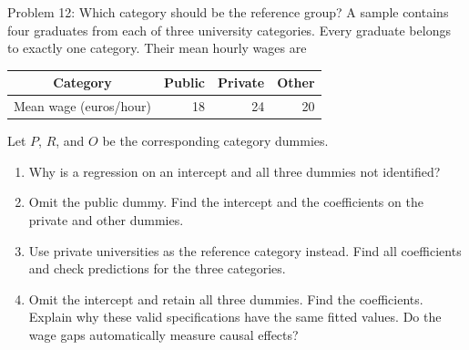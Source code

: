 \documentclass[notes,10pt, aspectratio=169]{beamer}
\begin{document}
\begin{frame}{Problem 12: Which category should be the reference group?}
A sample contains four graduates from each of three university categories. Every graduate belongs to exactly one category. Their mean hourly wages are
\begin{center}
\begin{tabular}{c|rrr}
Category & Public & Private & Other\\ \hline
Mean wage (euros/hour) & 18 & 24 & 20
\end{tabular}
\end{center}
Let $P$, $R$, and $O$ be the corresponding category dummies.
\begin{enumerate}
\setlength{\itemsep}{6pt}
\item Why is a regression on an intercept and all three dummies not identified?
\item Omit the public dummy. Find the intercept and the coefficients on the private and other dummies.
\item Use private universities as the reference category instead. Find all coefficients and check predictions for the three categories.
\item Omit the intercept and retain all three dummies. Find the coefficients. Explain why these valid specifications have the same fitted values. Do the wage gaps automatically measure causal effects?
\end{enumerate}
\end{frame}
\end{document}
